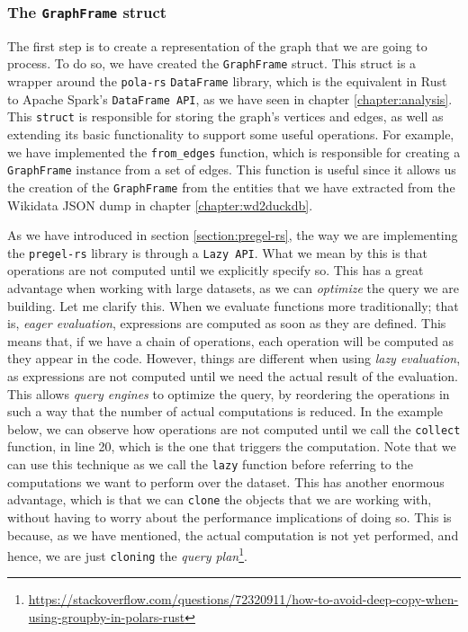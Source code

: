 \subsubsection{The \texttt{GraphFrame} struct}

The first step is to create a representation of the graph that we are going to process. To do so, we have created the \texttt{GraphFrame} struct. This struct is a wrapper around the \texttt{pola-rs} \texttt{DataFrame} library, which is the equivalent in Rust to Apache Spark's \texttt{DataFrame API}, as we have seen in chapter \ref{chapter:analysis}. This \texttt{struct} is responsible for storing the graph's vertices and edges, as well as extending its basic functionality to support some useful operations. For example, we have implemented the \texttt{from\_edges} function, which is responsible for creating a \texttt{GraphFrame} instance from a set of edges. This function is useful since it allows us the creation of the \texttt{GraphFrame} from the entities that we have extracted from the Wikidata JSON dump in chapter \ref{chapter:wd2duckdb}.

As we have introduced in section \ref{section:pregel-rs}, the way we are implementing the \texttt{pregel-rs} library is through a \texttt{Lazy API}. What we mean by this is that operations are not computed until we explicitly specify so. This has a great advantage when working with large datasets, as we can \textit{optimize} the query we are building. Let me clarify this. When we evaluate functions more traditionally; that is, \textit{eager evaluation}, expressions are computed as soon as they are defined. This means that, if we have a chain of operations, each operation will be computed as they appear in the code. However, things are different when using \textit{lazy evaluation}, as expressions are not computed until we need the actual result of the evaluation. This allows \textit{query engines} to optimize the query, by reordering the operations in such a way that the number of actual computations is reduced. In the example below, we can observe how operations are not computed until we call the \texttt{collect} function, in line 20, which is the one that triggers the computation. Note that we can use this technique as we call the \texttt{lazy} function before referring to the computations we want to perform over the dataset. This has another enormous advantage, which is that we can \texttt{clone} the objects that we are working with, without having to worry about the performance implications of doing so. This is because, as we have mentioned, the actual computation is not yet performed, and hence, we are just \texttt{cloning} the \textit{query plan}\footnote{\url{https://stackoverflow.com/questions/72320911/how-to-avoid-deep-copy-when-using-groupby-in-polars-rust}}.

